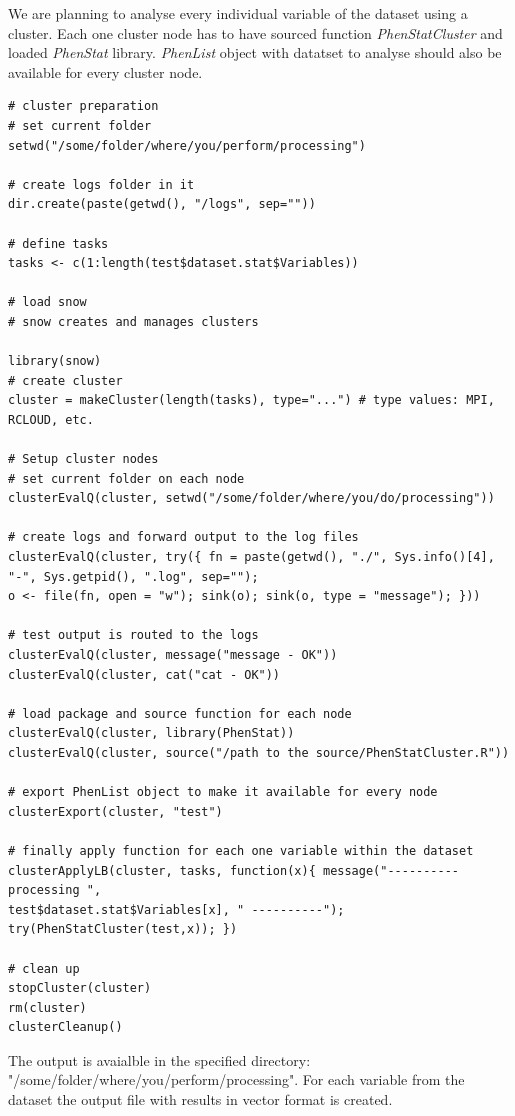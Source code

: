 \documentclass[12pt,a4paper]{article}
\begin{document}
We are planning to analyse every individual variable of the dataset using a cluster. Each one cluster node has to have sourced function \textit{PhenStatCluster} and loaded \textit{PhenStat} library. 
\textit{PhenList} object with datatset to analyse should also be available for every cluster node.
\begingroup
\fontsize{8pt}{12pt}\selectfont
\begin{verbatim}
# cluster preparation
# set current folder
setwd("/some/folder/where/you/perform/processing")

# create logs folder in it
dir.create(paste(getwd(), "/logs", sep=""))

# define tasks
tasks <- c(1:length(test$dataset.stat$Variables))

# load snow
# snow creates and manages clusters

library(snow)
# create cluster
cluster = makeCluster(length(tasks), type="...") # type values: MPI, RCLOUD, etc.

# Setup cluster nodes
# set current folder on each node
clusterEvalQ(cluster, setwd("/some/folder/where/you/do/processing"))

# create logs and forward output to the log files
clusterEvalQ(cluster, try({ fn = paste(getwd(), "./", Sys.info()[4], "-", Sys.getpid(), ".log", sep=""); 
o <- file(fn, open = "w"); sink(o); sink(o, type = "message"); }))

# test output is routed to the logs
clusterEvalQ(cluster, message("message - OK"))
clusterEvalQ(cluster, cat("cat - OK"))

# load package and source function for each node
clusterEvalQ(cluster, library(PhenStat))
clusterEvalQ(cluster, source("/path to the source/PhenStatCluster.R"))

# export PhenList object to make it available for every node
clusterExport(cluster, "test") 

# finally apply function for each one variable within the dataset
clusterApplyLB(cluster, tasks, function(x){ message("---------- processing ", 
test$dataset.stat$Variables[x], " ----------"); try(PhenStatCluster(test,x)); })

# clean up
stopCluster(cluster)
rm(cluster)
clusterCleanup()
\end{verbatim}
\endgroup

The output is avaialble in the specified directory: 
"/some/folder/where/you/perform/processing". 
For each variable from the dataset the output file with results in vector format is created.
\end{document}
